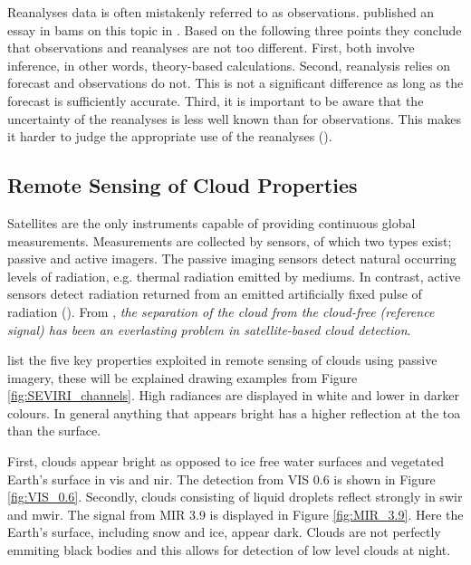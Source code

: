 Reanalyses data is often mistakenly referred to as observations. \citeauthor{Parker2016ReanalysesDifference} published an essay in \acrfull{bams} on this topic in \citeyear{Parker2016ReanalysesDifference}. Based on the following three points they conclude that observations and reanalyses are not too different. First, both involve inference, in other words, theory-based calculations. Second, reanalysis relies on forecast and observations do not. This is not a significant difference as long as the forecast is sufficiently accurate. Third, it is important to be aware that the uncertainty of the reanalyses is less well known than for observations. This makes it harder to judge the appropriate use of the reanalyses (\cite{Parker2016ReanalysesDifference}). 

\subsection{Remote Sensing of Cloud Properties}
Satellites are the only instruments capable of providing continuous global measurements.
Measurements are collected by sensors, of which two types exist; passive and active imagers. The passive imaging sensors detect natural occurring levels of radiation, e.g. thermal radiation emitted by mediums. In contrast, active sensors  detect radiation returned from an emitted artificially fixed pulse of radiation (\cite{Stephens2018CloudsatSystem}). From \cite{Stockli2019CloudApplications}, \textit{the separation of the cloud from the cloud-free (reference signal) has been an everlasting problem in satellite-based cloud detection}.


 list the five key properties exploited in remote sensing of clouds using passive imagery, these will be explained drawing examples from Figure \ref{fig:SEVIRI_channels}. High radiances are displayed in white and lower in darker colours. In general anything that appears bright has a higher reflection at the \acrshort{toa} than the surface. 

First, clouds appear bright as opposed to ice free water surfaces and vegetated Earth's surface in \acrshort{vis} and \acrshort{nir}. The detection from VIS 0.6 is shown in Figure \ref{fig:VIS_0.6}. Secondly, clouds consisting of liquid droplets reflect strongly in \acrfull{swir} and \acrfull{mwir}. The signal from MIR 3.9 is displayed in Figure \ref{fig:MIR_3.9}. Here the Earth's surface, including snow and ice, appear dark. Clouds are not perfectly emmiting black bodies and this allows for detection of low level clouds at night.

